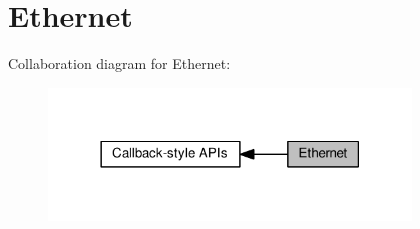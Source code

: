 \hypertarget{group__ethernet}{}\section{Ethernet}
\label{group__ethernet}
Collaboration diagram for Ethernet\+:
\nopagebreak
\begin{figure}[H]
\begin{center}
\leavevmode
\includegraphics[width=273pt]{group__ethernet}
\end{center}
\end{figure}
